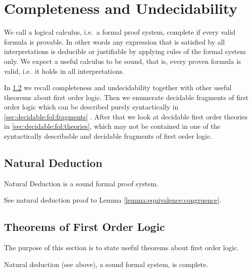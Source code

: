 

\chapter{Completeness and Undecidability}

	We call a logical calculus, i.e.~a formal proof system, {\myem complete} if every valid formula is provable.
	In other words any expression that is satisfied by all interpretations 
	is deducible or justifiable by applying rules of the formal system only.
	We expect a useful calculus to be {\myem sound}, that is, every proven formula is valid, 
	i.e.~it holds in all interpretations.

In \ref{sec:decidable:fol:theorems} we recall completeness and undecidability 
together with other useful theorems about first order logic.
Then we enumerate decidable fragments of first order logic
which can be described purely syntactically in \ref{sec:decidable:fol:fragments} .
After that we look at decidable first order theories in \ref{sec:decidable:fol:theories}, 
which may not be contained in one of the syntactically describable and decidable fragments of first order logic.

\section{Natural Deduction}
\label{sec:natural:deduction}

Natural Deduction is a sound formal proof system.

See natural deduction proof to Lemma \vref{lemma:equivalence:congruence}.




\section{Theorems of First Order Logic}\label{sec:decidable:fol:theorems}

The purpose of this section is to state useful theorems about first order logic.

\begin{theorem}
	Natural deduction (see above), a sound formal system, is complete.
\end{theorem}


